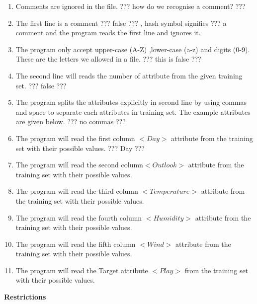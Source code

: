 \documentclass{report}
\begin{document}
\begin{enumerate}
\item Comments are ignored in the file. ??? how do we recognise a comment? ???
\item The first line is a comment ??? false ??? , hash symbol signifies ??? a comment and the program reads the first line and ignores it. 
\item The program only accept upper-case (A-Z) ,lower-case (a-z) and digits (0-9). These are the letters we allowed  in a file. ??? this is false ???
\item The second line will reads the number of attribute from the given training set. ??? false ???
\item The program splits the attributes explicitly in second line by using commas and space to separate each attributes in training set. The example attributes are given below. ??? no commas ???
\item The program will read the first column $<Day>$ attribute from the training set with their possible values. ??? Day ???
\item The program will read the second column$<Outlook>$ attribute from the training set with their possible values.
\item The program will read the third column $<Temperature>$ attribute from the training set with their possible values.
\item The program will read the fourth column $<Humidity>$ attribute from the training set with their possible values.
\item The program will read the fifth column $<Wind>$ attribute from the training set with their possible values. 
\item The program will read the Target attribute $<Play>$ from the training set with their possible values.

\end{enumerate}

{\bf Restrictions}
\end{document}
